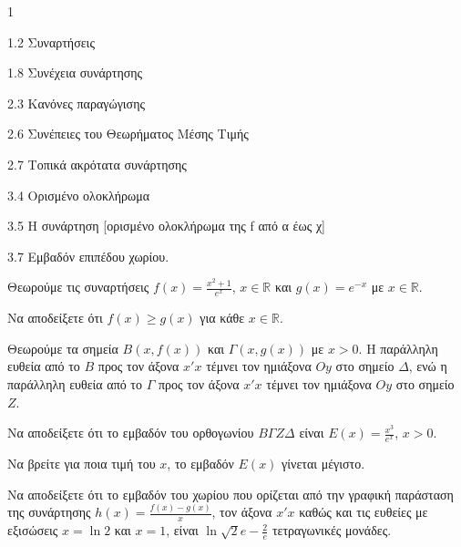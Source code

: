 \begin{ylh}{1}
    \item 1.2 Συναρτήσεις
    \item 1.8 Συνέχεια συνάρτησης
    \item 2.3 Κανόνες παραγώγισης
    \item 2.6 Συνέπειες του Θεωρήματος Μέσης Τιμής
    \item 2.7 Τοπικά ακρότατα συνάρτησης
    \item 3.4 Ορισμένο ολοκλήρωμα
    \item 3.5 Η συνάρτηση [ορισμένο ολοκλήρωμα της f από α έως χ]
    \item 3.7 Εμβαδόν επιπέδου χωρίου.
\end{ylh}
Θεωρούμε τις συναρτήσεις $f(x) = \frac{x^2+1}{e^x}$, $x \in \mathbb{R}$ και $g(x) = e^{-x}$ με $x \in \mathbb{R}$.
\begin{alist}
\item Να αποδείξετε ότι $f(x) \ge g(x)$ για κάθε $x \in \mathbb{R}$.  
\item Θεωρούμε τα σημεία $B(x, f(x))$ και $\Gamma(x, g(x))$ με $x > 0$. Η παράλληλη ευθεία από το $B$ προς τον άξονα $x'x$ τέμνει τον ημιάξονα $Oy$ στο σημείο $\Delta$, ενώ η παράλληλη ευθεία από το $\Gamma$ προς τον άξονα $x'x$ τέμνει τον ημιάξονα $Oy$ στο σημείο $Z$.
    \begin{rlist}
    \item Να αποδείξετε ότι το εμβαδόν του ορθογωνίου $B\Gamma Z\Delta$ είναι $E(x) = \frac{x^3}{e^x}$, $x > 0$.  
    \item Να βρείτε για ποια τιμή του $x$, το εμβαδόν $E(x)$ γίνεται μέγιστο.  
    \end{rlist}
\item Να αποδείξετε ότι το εμβαδόν του χωρίου που ορίζεται από την γραφική παράσταση της συνάρτησης $h(x) = \frac{f(x)-g(x)}{x}$, τον άξονα $x'x$ καθώς και τις ευθείες με εξισώσεις $x = \ln2$ και $x = 1$, είναι $\ln\sqrt{2}e - \frac{2}{e}$ τετραγωνικές μονάδες.  
\end{alist}